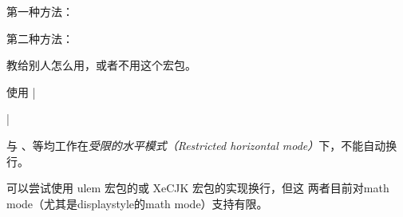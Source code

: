 


第一种方法：
\begin{texlist}
  \newcommand{\mycmd}[2][\DefaultOpt]{%
    \def\DefaultOpt{#2}%
    optional arg: #1,  mandatory arg: #2%
  }
\end{texlist}

第二种方法：
\begin{texlist}
  \def\mycmd{\futurelet\testchar\WithOptCmd}
  \def\WithOptCmd{%
    \ifx[\testchar 
      \let\next\OptCmd 
    \else 
      \let\next\NoOptCmd 
    \fi\next}
  \def\OptCmd[#1]#2{optional arg: #1,  mandatory arg: #2}
  \def\NoOptCmd#1{optional arg: #1,  mandatory arg: #1}
\end{texlist}



教给别人怎么用，或者不用这个宏包。





使用 |\usepackage{indentfirst}|



















与 、等均工作在\textit{受限的水平模式（Restricted
  horizontal mode）}下，不能自动换行。

可以尝试使用 ulem 宏包的或 XeCJK 宏包的实现换行，但这
两者目前对math mode（尤其是displaystyle的math mode）支持有限。


